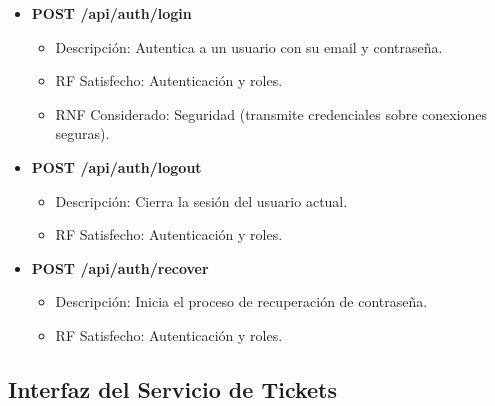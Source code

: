 \documentclass[12pt,a4paper]{article}
\begin{document}
\begin{itemize}
    \item \textbf{POST /api/auth/login}
    \begin{itemize}
        \item Descripción: Autentica a un usuario con su email y contraseña.
        \item RF Satisfecho: Autenticación y roles.
        \item RNF Considerado: Seguridad (transmite credenciales sobre conexiones seguras).
    \end{itemize}
    
    \item \textbf{POST /api/auth/logout}
    \begin{itemize}
        \item Descripción: Cierra la sesión del usuario actual.
        \item RF Satisfecho: Autenticación y roles.
    \end{itemize}
    
    \item \textbf{POST /api/auth/recover}
    \begin{itemize}
        \item Descripción: Inicia el proceso de recuperación de contraseña.
        \item RF Satisfecho: Autenticación y roles.
    \end{itemize}
\end{itemize}

\subsection{Interfaz del Servicio de Tickets}
\end{document}
